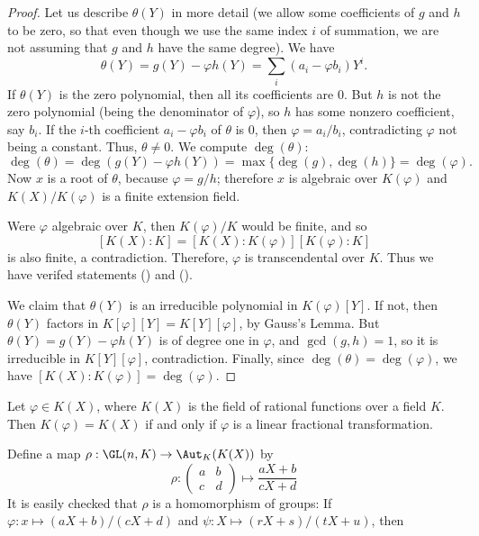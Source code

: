 \begin{proof}
Let us describe $\theta(Y)$ in more detail (we allow some coefficients of $g$ and $h$ to be zero, so that even though we use the same index $i$ of summation, we are not assuming that $g$ and $h$ have the same degree). We have 
\[\theta(Y)=g(Y)-\varphi h(Y)=\sum_i(a_i-\varphi b_i)Y^i.\]
If $\theta(Y)$ is the zero polynomial, then all its coefficients are $0$. But $h$ is not the zero polynomial (being the denominator of $\varphi$), so $h$ has some nonzero coefficient, say $b_i$. If the $i$-th coefficient $a_i-\varphi b_i$ of $\theta$ is $0$, then $\varphi=a_i/b_i$, contradicting $\varphi$ not being a constant. Thus, $\theta\neq 0$. We compute $\deg(\theta)$:
\[\deg(\theta)=\deg(g(Y)-\varphi h(Y))=\max\{\deg(g),\deg(h)\}=\deg(\varphi).\]
Now $x$ is a root of $\theta$, because $\varphi=g/h$; therefore $x$ is algebraic over $K(\varphi)$ and $K(X)/K(\varphi)$ is a finite extension field.\par
Were $\varphi$ algebraic over $K$, then $K(\varphi)/K$ would be finite, and so
\[[K(X):K]=[K(X):K(\varphi)][K(\varphi):K]\]
is also finite, a contradiction. Therefore, $\varphi$ is transcendental over $K$. Thus we have verifed statements () and ().\par
We claim that $\theta(Y)$ is an irreducible polynomial in $K(\varphi)[Y]$. If not, then $\theta(Y)$ factors in $K[\varphi][Y]=K[Y][\varphi]$, by Gauss's Lemma. But $\theta(Y)=g(Y)-\varphi h(Y)$ is of degree one in $\varphi$, and $\gcd(g,h)=1$, so it is irreducible in $K[Y][\varphi]$, contradiction. Finally, since $\deg(\theta)=\deg(\varphi)$, we have $[K(X):K(\varphi)]=\deg(\varphi)$.
\end{proof}
\begin{corollary}
Let $\varphi\in K(X)$, where $K(X)$ is the field of rational functions over a field $K$. Then $K(\varphi)=K(X)$ if and only if $\varphi$ is a linear fractional transformation.
\end{corollary}
Define a map $\rho:\GL(n,K)\to\Aut_K(K(X))$ by
\[\rho:\begin{pmatrix}
a&b\\
c&d
\end{pmatrix}\mapsto\frac{aX+b}{cX+d}\]
It is easily checked that $\rho$ is a homomorphism of groups: If $\varphi:x\mapsto(aX+b)/(cX+d)$ and $\psi:X\mapsto(rX+s)/(tX+u)$, then
